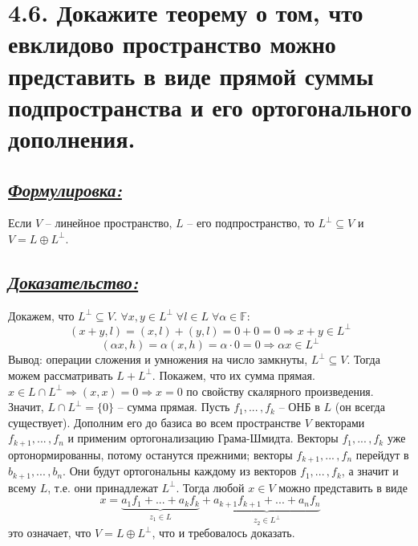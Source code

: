 \documentclass{article}
\begin{document}
\section*{\LARGE 4.6. Докажите теорему о том, что евклидово пространство можно представить в виде прямой суммы подпространства и его ортогонального дополнения.}
\subsection*{\Large \underline{\textit{Формулировка: }}}
Если $V$ -- линейное пространство, $L$ -- его подпространство, то $L^\perp \subseteq V$ и 
\newline $V = L \oplus L^\perp$.

\subsection*{\Large \underline{\textit{Доказательство: }}}
Докажем, что $L^\perp \subseteq V$. $\forall x,y \in L^\perp \; \forall l \in L \; \forall \alpha \in \mathbb{F}$:
$$ (x + y, l) = (x, l) + (y, l) = 0 + 0 = 0 \Rightarrow x + y \in L^\perp $$
$$ (\alpha x, h) = \alpha(x, h) = \alpha \cdot 0 = 0 \Rightarrow \alpha x \in L^\perp $$
Вывод: операции сложения и умножения на число замкнуты, $L^\perp \subseteq V$. Тогда можем рассматривать $L + L^\perp$. Покажем, что их сумма прямая. $x \in L \cap L^\perp \Rightarrow (x, x) = 0 \Rightarrow x = 0$ по свойству скалярного произведения. Значит, $L \cap L^\perp = \{0\}$ -- сумма прямая. 
\newline Пусть $f_1, ...\,, f_k$ -- ОНБ в $L$ (он всегда существует). Дополним его до базиса во всем пространстве $V$ векторами $f_{k + 1}, ...\,, f_n$ и применим ортогонализацию Грама-Шмидта. Векторы $f_1, ...\,, f_k$ уже ортонормированны, потому останутся прежними; векторы $f_{k + 1}, ...\,, f_n$ перейдут в $b_{k + 1}, ...\,, b_n$. Они будут ортогональны каждому из векторов $f_1, ...\,, f_k$, а значит и всему $L$, т.е. они принадлежат $L^\perp$. Тогда любой $x \in V$ можно представить в виде
$$
x = \underbrace{a_1f_1 + ... + a_kf_k}_{z_1 \in L} + \underbrace{a_{k + 1}f_{k + 1} + ... + a_nf_n}_{z_2 \in L^\perp}
$$
это означает, что $V = L \oplus L^\perp$, что и требовалось доказать.

\end{document}
